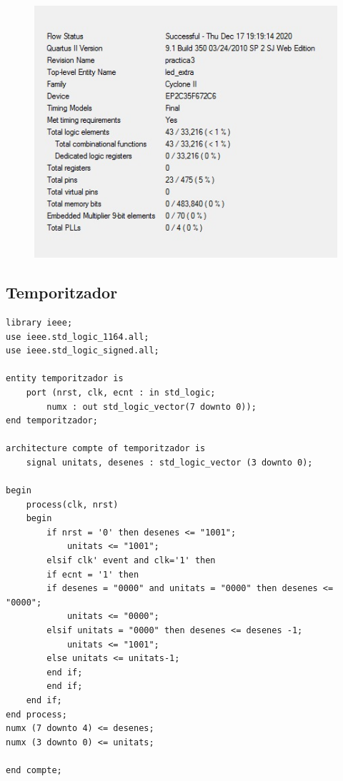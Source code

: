 \documentclass[12pt, a4papre]{article}
\begin{document}
	
			\begin{figure}[H]
			
				\begin{center}
		\includegraphics[width=130mm]{informeLeds.jpeg}
		\end{center}
	\end{figure}
	
\subsection{Temporitzador}


\begin{lstlisting}[style=vhdl, frame=single, basicstyle=\tiny]
	library ieee;
use ieee.std_logic_1164.all;
use ieee.std_logic_signed.all;

entity temporitzador is
	port (nrst, clk, ecnt : in std_logic;
		numx : out std_logic_vector(7 downto 0));
end temporitzador;

architecture compte of temporitzador is 
	signal unitats, desenes : std_logic_vector (3 downto 0);
	
begin 
	process(clk, nrst)
	begin
	    if nrst = '0' then desenes <= "1001";
			unitats <= "1001";
	    elsif clk' event and clk='1' then
		if ecnt = '1' then
		if desenes = "0000" and unitats = "0000" then desenes <= "0000";
			unitats <= "0000";
		elsif unitats = "0000" then desenes <= desenes -1;
			unitats <= "1001";
		else unitats <= unitats-1;
		end if;
	    end if;
	end if;
end process;
numx (7 downto 4) <= desenes;
numx (3 downto 0) <= unitats;

end compte;
	\end{lstlisting}
	
\end{document}
